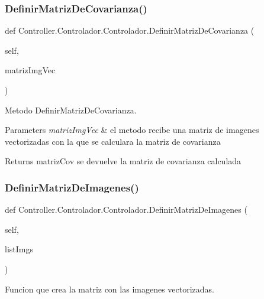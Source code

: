 \subsubsection{\texorpdfstring{Definir\+Matriz\+De\+Covarianza()}{DefinirMatrizDeCovarianza()}}
{\footnotesize\ttfamily def Controller.\+Controlador.\+Controlador.\+Definir\+Matriz\+De\+Covarianza (\begin{DoxyParamCaption}\item[{}]{self,  }\item[{}]{matriz\+Img\+Vec }\end{DoxyParamCaption})}



Metodo Definir\+Matriz\+De\+Covarianza. 


\begin{DoxyParams}{Parameters}
{\em matriz\+Img\+Vec} & el metodo recibe una matriz de imagenes vectorizadas con la que se calculara la matriz de covarianza \\
\hline
\end{DoxyParams}
\begin{DoxyReturn}{Returns}
matriz\+Cov se devuelve la matriz de covarianza calculada 
\end{DoxyReturn}
\mbox{\label{class_controller_1_1_controlador_1_1_controlador_a88254f919a6b1d7ed25e2f54b528a15c}} 
\subsubsection{\texorpdfstring{Definir\+Matriz\+De\+Imagenes()}{DefinirMatrizDeImagenes()}}
{\footnotesize\ttfamily def Controller.\+Controlador.\+Controlador.\+Definir\+Matriz\+De\+Imagenes (\begin{DoxyParamCaption}\item[{}]{self,  }\item[{}]{list\+Imgs }\end{DoxyParamCaption})}



Funcion que crea la matriz con las imagenes vectorizadas. 


